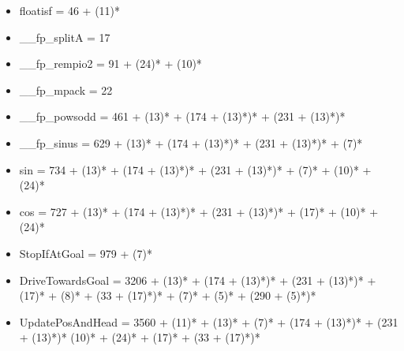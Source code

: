 \begin{itemize}
	\item floatisf = 46 + (11)*
	\item \_\_fp\_splitA = 17
	\item \_\_fp\_rempio2 = 91 + (24)* + (10)*
	\item \_\_fp\_mpack = 22
	\item \_\_fp\_powsodd = 461 + (13)* + (174 + (13)*)* + (231 + (13)*)*
	\item \_\_fp\_sinus = 629 + (13)* + (174 + (13)*)* + (231 + (13)*)* + (7)*
	\item sin = 734 + (13)* + (174 + (13)*)* + (231 + (13)*)* + (7)* + (10)* + (24)*
	\item cos = 727 + (13)* + (174 + (13)*)* + (231 + (13)*)* + (17)* + (10)* + (24)*
	\item StopIfAtGoal = 979 + (7)*
	\item DriveTowardsGoal = 3206 + (13)* + (174 + (13)*)* + (231 + (13)*)* + (17)* + (8)* + (33 + (17)*)* + (7)* + (5)* + (290 + (5)*)*
	\item UpdatePosAndHead = 3560 + (11)* + (13)* + (7)* + (174 + (13)*)* + (231 + (13)*)* (10)* + (24)* + (17)* + (33 + (17)*)*
\end{itemize}